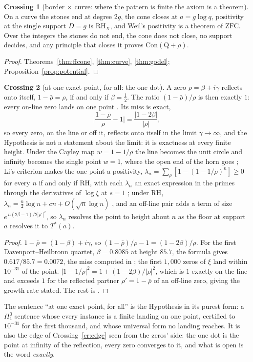 \documentclass[11pt]{article}
\theoremstyle{definition}
\newtheorem{crossing}{Crossing}
\theoremstyle{remark}
\newcommand{\ZFC}{\mathrm{ZFC}}
\newcommand{\Con}{\mathrm{Con}}
\newcommand{\Tst}{T^{*}}
\begin{document}
\begin{crossing}[border $\times$ curve: where the pattern is finite the axiom is a theorem]\label{cr:finite}
On a curve the stones end at degree $2g$, the cone closes at $a=g\log q$, positivity at the single support $D=g$ is $\mathrm{RH}_X$, and Weil's positivity is a theorem of $\ZFC$. Over the integers the stones do not end, the cone does not close, no support decides, and any principle that closes it proves $\Con(\mathrm Q+\rho)$.
\end{crossing}
\begin{proof}
Theorems~\ref{thm:ffcone}, \ref{thm:curve}, \ref{thm:godel}; Proposition~\ref{prop:potential}.
\end{proof}

\begin{crossing}[at one exact point, for all: the one dot]\label{cr:onedot}
A zero $\rho=\beta+i\gamma$ reflects onto itself, $1-\bar\rho=\rho$, if and only if $\beta=\tfrac12$. The ratio $(1-\bar\rho)/\rho$ is then exactly $1$: every on-line zero lands on one point \cite[\S9, Comp.\ 9.6]{folds}. Its miss is exact,
\[
\Big|\frac{1-\bar\rho}{\rho}-1\Big|=\frac{|1-2\beta|}{|\rho|},
\]
so every zero, on the line or off it, reflects onto itself in the limit $\gamma\to\infty$, and the Hypothesis is not a statement about the limit: it is exactness at every finite height. Under the Cayley map $w=1-1/\rho$ the line becomes the unit circle and infinity becomes the single point $w=1$, where the open end of the horn goes \cite[Fig.\ 23C]{folds}; Li's criterion \cite{li} makes the one point a positivity, $\lambda_n=\sum_\rho[1-(1-1/\rho)^n]\ge0$ for every $n$ if and only if $\mathrm{RH}$, with each $\lambda_n$ an exact expression in the primes through the derivatives of $\log\xi$ at $s=1$ \cite{bl}; under $\mathrm{RH}$, $\lambda_n=\tfrac n2\log n+cn+O(\sqrt n\log n)$ \cite{lagarias}, and an off-line pair adds a term of size $e^{\,n(2\beta-1)/2|\rho'|^2}$, so $\lambda_n$ resolves the point to height about $n$ as the floor at support $a$ resolves it to $\Tst(a)$.
\end{crossing}
\begin{proof}
$1-\bar\rho=(1-\beta)+i\gamma$, so $(1-\bar\rho)/\rho-1=(1-2\beta)/\rho$. For the first Davenport--Heilbronn quartet, $\beta=0.8085$ at height $85.7$, the formula gives $0.617/85.7=0.0072$, the miss computed in \cite[Comp.\ 9.6]{folds}; the first $1{,}000$ zeros of $\xi$ land within $10^{-31}$ of the point. $|1-1/\rho|^2=1+(1-2\beta)/|\rho|^2$, which is $1$ exactly on the line and exceeds $1$ for the reflected partner $\rho'=1-\bar\rho$ of an off-line zero, giving the growth rate stated. The rest is \cite{li,bl,lagarias}.
\end{proof}
The sentence ``at one exact point, for all'' is the Hypothesis in its purest form: a $\Pi^0_1$ sentence whose every instance is a finite landing on one point, certified to $10^{-31}$ for the first thousand, and whose universal form no landing reaches. It is also the edge of Crossing~\ref{cr:edge} seen from the zeros' side: the one dot is the point at infinity of the reflection, every zero converges to it, and what is open is the word \emph{exactly}.
\end{document}
